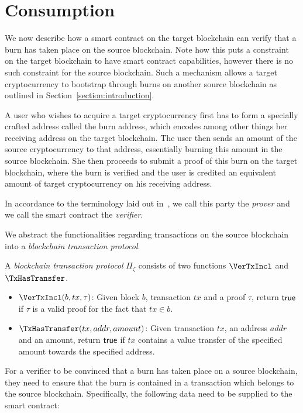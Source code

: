 \section{Consumption}

We now describe how a smart contract on the target blockchain can verify that a burn has taken place on the source blockchain. Note how this puts a constraint on the target blockchain to have smart contract capabilities, however there is no such constraint for the source blockchain. Such a mechanism allows a target cryptocurrency to bootstrap through burns on another source blockchain as outlined in Section~\ref{section:introduction}.

A user who wishes to acquire a target cryptocurrency first has to form a specially crafted address called the burn address, which encodes among other things her receiving address on the target blockchain. The user then sends an amount of the source cryptocurrency to that address, essentially burning this amount in the source blockchain. She then proceeds to submit a proof of this burn on the target blockchain, where the burn is verified and the user is credited an equivalent amount of target cryptocurrency on his receiving address.

In accordance to the terminology laid out in~\cite{pow-sidechains}, we call this party the \emph{prover} and we call the smart contract the \emph{verifier}.

We abstract the functionalities regarding transactions on the source blockchain into a \emph{blockchain transaction protocol}.

\begin{definition}
  A \emph{blockchain transaction protocol} $\Pi_\zeta$ consists of two functions $\VerTxIncl$ and $\TxHasTransfer$.

  \begin{itemize}
    \item $\VerTxIncl(b, tx, \tau)$: Given block $b$, transaction $tx$ and a proof $\tau$, return $\mathsf{true}$ if $\tau$ is a valid proof for the fact that $tx \in b$.
    \item $\TxHasTransfer(tx, addr, amount)$: Given transaction $tx$, an address $addr$ and an amount, return $\mathsf{true}$ if $tx$ contains a value transfer of the specified amount towards the specified address.
  \end{itemize}
\end{definition}

For a verifier to be convinced that a burn has taken place on a source blockchain, they need to ensure that the burn is contained in a transaction which belongs to the source blockchain. Specifically, the following data need to be supplied to the smart contract:

